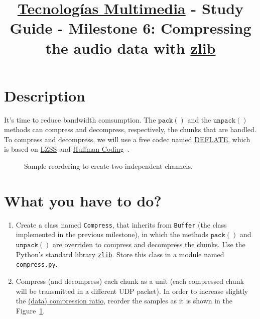 \title{\href{https://www.ual.es/estudios/grados/presentacion/plandeestudios/asignatura/4015/40154321?idioma=zh_CN}{Tecnologías Multimedia} - Study Guide - Milestone 6: Compressing the audio data with \href{https://zlib.net/}{zlib}}

\maketitle

\section{Description}

It's time to reduce bandwidth comsumption. The $\mathtt{pack()}$ and
the $\mathtt{unpack()}$ methods can compress and decompress,
respectively, the chunks that are handled. To compress and decompress,
we will use a free codec named
\href{https://en.wikipedia.org/wiki/DEFLATE}{DEFLATE}, which is based
on \href{https://en.wikipedia.org/wiki/Lempel%E2%80%93Ziv%E2%80%93Storer%E2%80%93Szymanski}{LZSS}
and \href{https://en.wikipedia.org/wiki/Huffman_coding}{Huffman Coding}~\cite{nelson96datacompression}.

\begin{figure}
  \begin{center}
  \end{center}
  \caption{Sample reordering to create two independent channels.}
  \label{fig:reordering}
\end{figure}

\section{What you have to do?}

\begin{enumerate}
\item Create a class named \texttt{Compress}, that inherits from
  \texttt{Buffer} (the class implemented in the previous milestone),
  in which the methods $\mathtt{pack()}$ and $\mathtt{unpack()}$ are
  overriden to compress and decompress the chunks. Use the Python's
  standard library
  \href{https://docs.python.org/3/library/zlib.html}{\texttt{zlib}}. Store
  this class in a module named \texttt{compress.py}.
\item Compress (and decompress) each chunk as a unit (each compressed
  chunk will be transmitted in a different UDP packet). In order to
  increase slightly the
  \href{https://en.wikipedia.org/wiki/Data_compression_ratio}{(data)
    compression ratio}, reorder the samples as it is shown in the
  Figure~\ref{fig:reordering}.
\end{enumerate}

